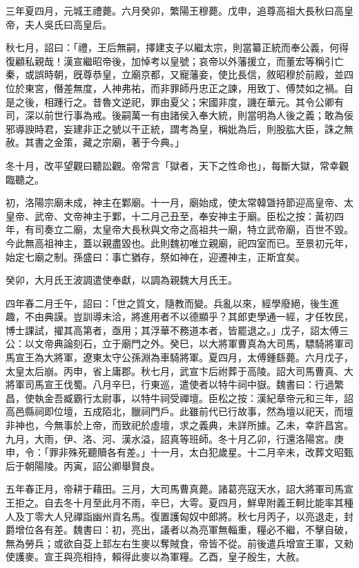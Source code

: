 \begin{pinyinscope}
三年夏四月，元城王禮薨。六月癸卯，繁陽王穆薨。戊申，追尊高祖大長秋曰高皇帝，夫人吳氏曰高皇后。

秋七月，詔曰：「禮，王后無嗣，擇建支子以繼太宗，則當纂正統而奉公義，何得復顧私親哉！漢宣繼昭帝後，加悼考以皇號；哀帝以外藩援立，而董宏等稱引亡秦，或誤時朝，旣尊恭皇，立廟京都，又寵藩妾，使比長信，敘昭穆於前殿，並四位於東宮，僭差無度，人神弗祐，而非罪師丹忠正之諫，用致丁、傅焚如之禍。自是之後，相踵行之。昔魯文逆祀，罪由夏父；宋國非度，譏在華元。其令公卿有司，深以前世行事為戒。後嗣萬一有由諸侯入奉大統，則當明為人後之義；敢為佞邪導諛時君，妄建非正之號以干正統，謂考為皇，稱妣為后，則股肱大臣，誅之無赦。其書之金策，藏之宗廟，著于今典。」

冬十月，改平望觀曰聽訟觀。帝常言「獄者，天下之性命也」，每斷大獄，常幸觀臨聽之。

初，洛陽宗廟未成，神主在鄴廟。十一月，廟始成，使太常韓曁持節迎高皇帝、太皇帝、武帝、文帝神主于鄴，十二月己丑至，奉安神主于廟。臣松之按：黃初四年，有司奏立二廟，太皇帝大長秋與文帝之高祖共一廟，特立武帝廟，百世不毀。今此無高祖神主，蓋以親盡毀也。此則魏初唯立親廟，祀四室而已。至景初元年，始定七廟之制。孫盛曰：事亡猶存，祭如神在，迎遷神主，正斯宜矣。

癸卯，大月氏王波調遣使奉獻，以調為親魏大月氏王。

四年春二月壬午，詔曰：「世之質文，隨教而變。兵亂以來，經學廢絕，後生進趣，不由典謨。豈訓導未洽，將進用者不以德顯乎？其郎吏學通一經，才任牧民，博士課試，擢其高第者，亟用；其浮華不務道本者，皆罷退之。」戊子，詔太傅三公：以文帝典論刻石，立于廟門之外。癸巳，以大將軍曹真為大司馬，驃騎將軍司馬宣王為大將軍，遼東太守公孫淵為車騎將軍。夏四月，太傅鍾繇薨。六月戊子，太皇太后崩。丙申，省上庸郡。秋七月，武宣卞后祔葬于高陵。詔大司馬曹真、大將軍司馬宣王伐蜀。八月辛巳，行東巡，遣使者以特牛祠中嶽。魏書曰：行過繁昌，使執金吾臧霸行太尉事，以特牛祠受禪壇。臣松之按：漢紀章帝元和三年，詔高邑縣祠即位壇，五成陌北，臘祠門戶。此雖前代已行故事，然為壇以祀天，而壇非神也，今無事於上帝，而致祀於虛壇，求之義典，未詳所據。乙未，幸許昌宮。九月，大雨，伊、洛、河、漢水溢，詔真等班師。冬十月乙卯，行還洛陽宮。庚申，令：「罪非殊死聽贖各有差。」十一月，太白犯歲星。十二月辛未，改葬文昭甄后于朝陽陵。丙寅，詔公卿舉賢良。

五年春正月，帝耕于藉田。三月，大司馬曹真薨。諸葛亮寇天水，詔大將軍司馬宣王拒之。自去冬十月至此月不雨，辛巳，大雩。夏四月，鮮卑附義王軻比能率其種人及丁零大人兒禪詣幽州貢名馬。復置護匈奴中郎將。秋七月丙子，以亮退走，封爵增位各有差。魏書曰：初，亮出，議者以為亮軍無輜重，糧必不繼，不擊自破，無為勞兵；或欲自芟上邽左右生麥以奪賊食，帝皆不從。前後遣兵增宣王軍，又勑使護麥。宣王與亮相持，賴得此麥以為軍糧。乙酉，皇子殷生，大赦。


\end{pinyinscope}
